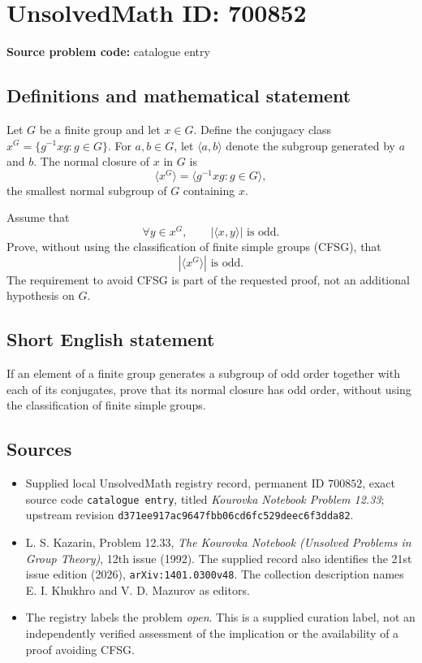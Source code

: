 \documentclass[11pt]{article}
\begin{document}
\section*{UnsolvedMath ID: 700852}
\textbf{Source problem code:} catalogue entry
\subsection{Definitions and mathematical statement}
Let \(G\) be a finite group and let \(x\in G\). Define the conjugacy class \(x^G=\{g^{-1}xg:g\in G\}\). For \(a,b\in G\), let \(\langle a,b\rangle\) denote the subgroup generated by \(a\) and \(b\). The normal closure of \(x\) in \(G\) is
\[
\langle x^G\rangle=\langle g^{-1}xg:g\in G\rangle,
\]
the smallest normal subgroup of \(G\) containing \(x\).

Assume that
\[
\forall y\in x^G,\qquad |\langle x,y\rangle|\text{ is odd}.
\]
Prove, without using the classification of finite simple groups (CFSG), that
\[
|\langle x^G\rangle|\text{ is odd}.
\]
The requirement to avoid CFSG is part of the requested proof, not an additional hypothesis on \(G\).
\subsection{Short English statement}
If an element of a finite group generates a subgroup of odd order together with each of its conjugates, prove that its normal closure has odd order, without using the classification of finite simple groups.
\subsection{Sources}
\begin{itemize}
\item Supplied local UnsolvedMath registry record, permanent ID \(700852\), exact source code \texttt{catalogue entry}, titled \emph{Kourovka Notebook Problem 12.33}; upstream revision \texttt{d371ee917ac9647fbb06cd6fc529deec6f3dda82}.
\item L. S. Kazarin, Problem 12.33, \emph{The Kourovka Notebook (Unsolved Problems in Group Theory)}, 12th issue (1992). The supplied record also identifies the 21st issue edition (2026), \texttt{arXiv:1401.0300v48}. The collection description names E. I. Khukhro and V. D. Mazurov as editors.
\item The registry labels the problem \emph{open}. This is a supplied curation label, not an independently verified assessment of the implication or the availability of a proof avoiding CFSG.
\end{itemize}
\end{document}
